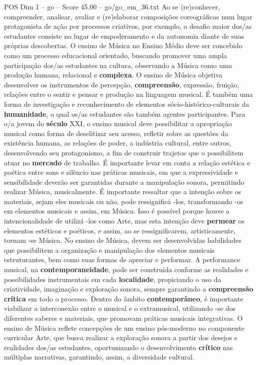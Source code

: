 \begin{textsample}{POS Dim 1 – go – Score 45.00 – go/go\_em\_36.txt}
Ao se (re)conhecer, compreender, analisar, avaliar e (re)elaborar composições coreográficas num lugar protagonista de ação por processos criativos, por exemplo, o desafio maior dos/as estudantes consiste no lugar de empoderamento e da autonomia diante de suas próprias descobertas.
O ensino de Música no Ensino Médio deve ser concebido como um processo educacional orientado, buscando promover uma ampla participação dos/as estudantes na cultura, observando a Música como uma produção humana, relacional e \textbf{complexa}.
O ensino de Música objetiva desenvolver os instrumentos de percepção, \textbf{compreensão}, expressão, fruição, relações entre o sentir e pensar e produção na linguagem musical.
É também uma forma de investigação e reconhecimento de elementos sócio-histórico-culturais da \textbf{humanidade}, o qual os/as estudantes são também agentes participantes.
Para o/a jovem do \textbf{século} XXI, o ensino musical deve possibilitar a apropriação musical como forma de deselitizar seu acesso, refletir sobre as questões da existência humana, as relações de poder, a indústria cultural, entre outros, desenvolvendo seu protagonismo, a fim de construir trajetos que o possibilitem atuar no \textbf{mercado} de trabalho.
É importante levar em conta a relação estética e poética entre sons e silêncio nas práticas musicais, em que a expressividade e sensibilidade deverão ser garantidas durante a manipulação sonora, permitindo realizar Música, musicalmente.
É importante ressaltar que a intenção sobre os materiais, sejam eles musicais ou não, pode ressignificá -los, transformando -os em elementos musicais e assim, em Música.
Isso é possível porque houve a intencionalidade de utilizá -los como Arte, mas esta intenção deve \textbf{permear} os elementos estéticos e poéticos, e assim, ao se ressignificarem, artisticamente, tornam -se Música.
No ensino de Música, devem ser desenvolvidas habilidades que possibilitem a organização e manipulação dos elementos musicais estruturantes, bem como suas formas de apreciar e performar.
A performance musical, na \textbf{contemporaneidade}, pode ser construída conforme as realidades e possibilidades instrumentais em cada \textbf{localidade}, propiciando o uso da criatividade, imaginação e exploração sonora, sempre garantindo a \textbf{compreensão} \textbf{crítica} em todo o processo.
Dentro do âmbito \textbf{contemporâneo}, é importante viabilizar a interconexão entre o musical e o extramusical, utilizando -se dos diferentes saberes e materiais, que promovam práticas musicais integrativas.
O ensino de Música reflete concepções de um ensino pós-moderno no componente curricular Arte, que busca realizar a exploração sonora a partir dos desejos e realidades dos/as estudantes, oportunizando o desenvolvimento \textbf{crítico} nas múltiplas narrativas, garantindo, assim, a diversidade cultural.

\end{textsample}
